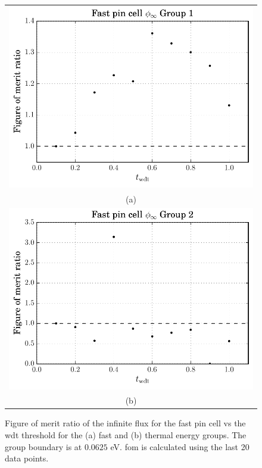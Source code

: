 \begin{figure}[hbtp]
  \centering
  \begin{tabular}{c}
  \includegraphics[scale=0.9]{images/results/fast_inf_flx_grp_1} \\
    (a) \\
  \includegraphics[scale=0.9]{images/results/fast_inf_flx_grp_2} \\
    (b) 
  \end{tabular}
  \caption[Figure of merit ratio of the infinite flux for the
  PWR]{Figure of merit ratio of the infinite flux for the fast pin cell vs the
    \gls{wdt} threshold for the (a) fast and (b) thermal energy
    groups. The group boundary is at $0.0625$ eV. \gls{fom} is
    calculated using the last 20 data points.}
  \label{fig:fast_inf_flx}
\end{figure}
